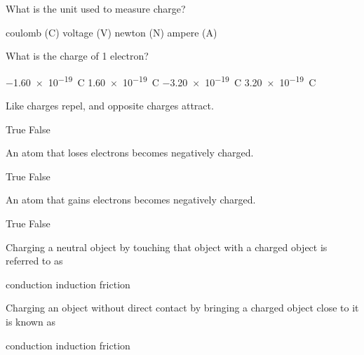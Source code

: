\documentclass[]{exam}
\begin{document}
\begin{questions}
\question 
What is the unit used to measure charge?

\begin{randomizechoices}
    \correctchoice coulomb (C)
    \choice voltage (V)
    \choice newton (N)
    \choice ampere (A)
\end{randomizechoices}

\question
What is the charge of 1 electron?

\begin{randomizechoices}
    \correctchoice \SI{-1.60e-19}{C}
    \choice \SI{1.60e-19}{C}
    \choice \SI{-3.20e-19}{C}
    \choice \SI{3.20e-19}{C}
\end{randomizechoices}

\end{questions}


\clearpage
\begin{questions}
\question
Like charges repel, and opposite charges attract.

\begin{randomizechoices}[norandomize]
    \correctchoice True
    \choice False
\end{randomizechoices}

\question
An atom that loses electrons becomes negatively charged.

\begin{randomizechoices}[norandomize]
    \choice True
    \correctchoice False
\end{randomizechoices}

\question
An atom that gains electrons becomes negatively charged.

\begin{randomizechoices}[norandomize]
    \correctchoice True
    \choice False
\end{randomizechoices}

\question
Charging a neutral object by touching that object with a charged object is referred to as

\begin{randomizechoices}
    \correctchoice conduction
    \choice induction
    \choice friction
\end{randomizechoices}

\question
Charging an object without direct contact by bringing a charged object close to it is known as

\begin{randomizechoices}
    \choice conduction
    \correctchoice induction
    \choice friction
\end{randomizechoices}


\end{questions}
\end{document}
